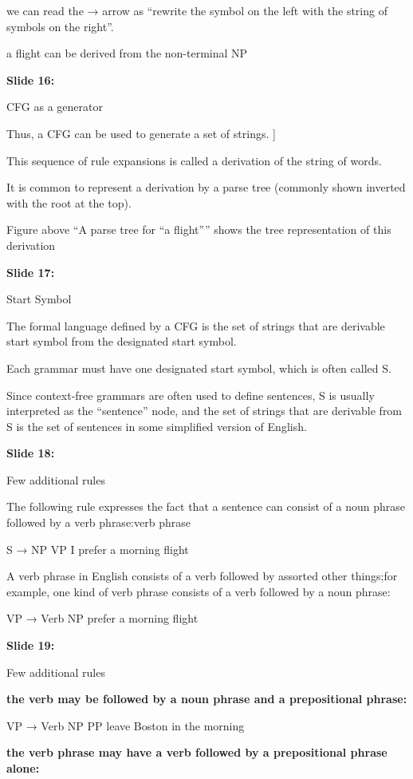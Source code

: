 \documentclass[11pt,a4paper]{article}
\begin{document}
we can read the → arrow as “rewrite the symbol on the left with the string of symbols on the right”.

a flight can be derived from the non-terminal NP

\textbf{Slide 16:}

CFG as a generator

Thus, a CFG can be used to generate a set of strings. ]

This sequence of rule expansions is called a derivation of the string of words.

It is common to represent a derivation by a parse tree (commonly shown inverted with the root at the top).

Figure above “A parse tree for “a flight”” shows the tree representation of this derivation

\textbf{Slide 17:}

Start Symbol

The formal language defined by a CFG is the set of strings that are derivable start symbol from the designated start symbol.

Each grammar must have one designated start symbol, which is often called S.

Since context-free grammars are often used to define sentences, S is usually interpreted as the “sentence” node, and the set of strings that are derivable from S is the set of sentences in some simplified version of English.

\textbf{Slide 18:}

Few additional rules

The following rule expresses the fact that a sentence can consist of a noun phrase followed by a verb phrase:verb phrase

S → NP VP        I prefer a morning flight

A verb phrase in English consists of a verb followed by assorted other things;for example, one kind of verb phrase consists of a verb followed by a noun phrase:

VP → Verb NP prefer a morning flight

\textbf{Slide 19:}

Few additional rules

\textbf{the verb may be followed by a noun phrase and a prepositional phrase:} 

VP → Verb NP PP     leave Boston in the morning

\textbf{the verb phrase may have a verb followed by a prepositional phrase alone:} 
\end{document}
